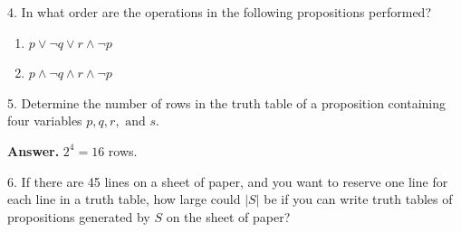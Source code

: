 \documentclass[10pt,]{book}
\theoremstyle{plain}
\theoremstyle{definition}
\theoremstyle{definition}
\theoremstyle{definition}
\theoremstyle{definition}
\begin{document}
\begin{exercisegroup}
%
\item[4.]\hypertarget{exercise-9}{}In what order are the operations in the following propositions performed?%
\par
\leavevmode%
\begin{enumerate}[label=\alph*]
\item\hypertarget{li-76}{} \(p \lor  \neg q \lor  r\land  \neg p\)%
\item\hypertarget{li-77}{} \(p \land  \neg  q \land  r \land  \neg  p\)%
\end{enumerate}
%
\par\smallskip
\item[5.]\hypertarget{exercise-10}{}Determine the number of rows in the truth table of a proposition containing four variables \(p, q, r, \textrm{ and }   s\).%
\par\smallskip
\par\smallskip
\noindent\textbf{Answer.}\hypertarget{answer-6}{}\quad
\(2^4 = 16\) rows.%
\item[6.]\hypertarget{exercise-11}{} If there are 45 lines on a sheet of paper, and you want to reserve one line for each line in a truth table, how large could \(\lvert S\rvert \) be if you can write truth tables of propositions generated by \(S\) on the sheet of paper?
%
\par\smallskip
\end{exercisegroup}
\par\smallskip\noindent
\typeout{************************************************}
\typeout{************************************************}
\end{document}
